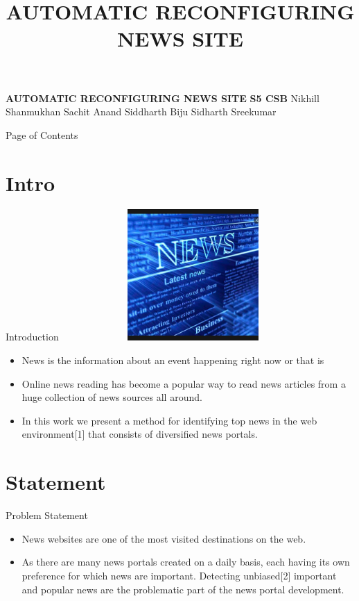 \documentclass{beamer}
\title{AUTOMATIC RECONFIGURING NEWS SITE}
\begin{document}
\begin{frame}{}
\centering \textbf{ AUTOMATIC RECONFIGURING NEWS SITE} \newline \newline
\centering \textbf {           S5 CSB} \newline \newline
\centering\small Nikhill Shanmukhan \newline
\centering Sachit Anand \newline
\centering Siddharth Biju \newline
\centering Sidharth Sreekumar \newline
\end{frame}
	\begin{frame}{Page of Contents}
		\tableofcontents
	\end{frame}
	\section{Intro}
	\begin{frame}{Introduction}
	    \includegraphics[width=10cm, height=5cm]{Shot.png}
		\begin{itemize}
			\item \Large{News is the information about an event happening right
			now or that is}
		\end{itemize}
	\end{frame}
	\begin{frame}{}
	    \begin{itemize}
			\item\Large Online news reading has become a popular way to read news articles from a huge collection of news sources all around.
			\item In this work we present a method for identifying top news in the web environment[1] that consists of diversiﬁed news portals. 
		\end{itemize}
	\end{frame}
	\section{Statement}
	\begin{frame}{Problem Statement}
	    \begin{itemize}
	        \item  \Large{News websites are one of the most visited destinations on the web.}
	        \item \Large { As there are many news portals created on a daily basis, each having its own preference for which news are important. Detecting unbiased[2] important and popular news are the problematic part of the news portal development.}
	    \end{itemize}
	\end{frame}
\end{document}
